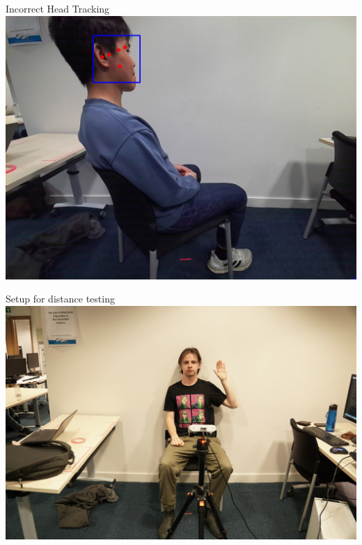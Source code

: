 
\begin{figureBox}[label={fig:incorrect-head-track}, width=0.7\linewidth]{Incorrect Head Tracking}
	\includegraphics[width = 1.0\linewidth]{./evaluation/figures/incorrectTrackedFace.png}
\end{figureBox}


\begin{figureBox}[label={fig:distance-setup}, width=0.7\linewidth]{Setup for distance testing}
	\includegraphics[width = 1.0\linewidth]{./evaluation/figures/distance_setup.jpg}
\end{figureBox}


